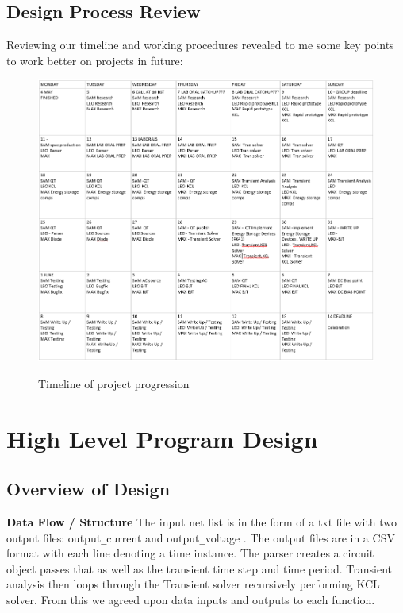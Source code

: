 \documentclass{article}
\begin{document}
\newpage
\subsection{Design Process Review}


Reviewing our timeline and working procedures revealed to me some key points to work better on projects in future:
\begin{figure}[h]
    \caption{Timeline of project progression}
    \centering
    \includegraphics[width=0.7\linewidth]{images/Timeline.PNG}
    \label{fig:Timeline}
\end{figure}


\newpage

\section{High Level Program Design }
\subsection{Overview of Design}
\textbf{Data Flow / Structure}
\newline
The input net list is in the form of a txt file with two output files: output\verb|_|current and output\verb|_|voltage . The output files are in a CSV format with each line denoting a time instance. The parser creates a circuit object passes that as well as the transient time step and time period. Transient analysis then loops through the Transient solver recursively performing KCL solver. From this we agreed upon data inputs and outputs to each function.
\end{document}
